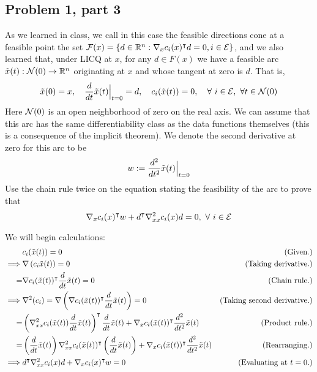 \subsection{Problem 1, part 3}
As we learned in class, we call in this case the feasible directions cone at a feasible point the set $\mathcal{F}(x) = \{ d \in \mathbb{R}^n : \nabla_x c_i(x)^{\intercal} d = 0, i \in \mathcal{E}\}$, and we also learned that, under LICQ at $x$, for any $d \in F(x)$ we have a feasible arc $\Tilde{x}(t): \mathcal{N}(0) \rightarrow \mathbb{R}^n$ originating at $x$ and whose tangent at zero is $d$. That is, 
\[\Tilde{x}(0) = x, \quad \frac{d}{dt}\Tilde{x}(t) \Big|_{t = 0} = d, \quad c_i(\Tilde{x}(t)) = 0,  \quad \forall \ i \in \mathcal{E}, \ \forall t \in \mathcal{N}(0)\]
Here $\mathcal{N}(0)$ is an open neighborhood of zero on the real axis. We can assume that this arc has the same differentiability class as the data functions themselves (this is a consequence of the implicit theorem). We denote the second derivative at zero for this arc to be 
\[w := \frac{d^2}{dt^2}\Tilde{x}(t)\Big|_{t = 0}\]
Use the chain rule twice on the equation stating the feasibility of the arc to prove that
\[\nabla_x c_i(x)^{\intercal} w + d^{\intercal} \nabla_{xx}^2c_i(x) d = 0, \ \forall \ i \in \mathcal{E}\]
\partbreak
\begin{solution}
    
    We will begin calculations:
    \tightalignbreak
    \begin{align*}
        &c_i(\Tilde{x}(t)) = 0 &\text{(Given.)}\\
        \implies &\nabla\left( c_i\Tilde{x}(t)\right) = 0 &\text{(Taking derivative.)}\\
        =& \nabla c_i(\Tilde{x}(t))^{\intercal} \frac{d}{dt}\Tilde{x}(t) = 0 &\text{(Chain rule.)}\\
        \implies & \nabla^2(c_i) = \nabla\left(\nabla c_i(\Tilde{x}(t))^{\intercal} \frac{d}{dt}\Tilde{x}(t) \right) = 0 &\text{(Taking second derivative.)}\\
        =& \left(\nabla^2_{xx} c_i(\Tilde{x}(t)) \frac{d}{dt}\Tilde{x}(t)\right)^{\intercal} \frac{d}{dt}\Tilde{x}(t) + \nabla_x c_i(\Tilde{x}(t))^{\intercal} \frac{d^2}{dt^2}\Tilde{x}(t) &\text{(Product rule.)}\\
        =&\left(\frac{d}{dt}\Tilde{x}(t)\right)\nabla^2_{xx} c_i(\Tilde{x}(t))^{\intercal}  \left(\frac{d}{dt}\Tilde{x}(t)\right) + \nabla_x c_i(\Tilde{x}(t))^{\intercal} \frac{d^2}{dt^2}\Tilde{x}(t) &\text{(Rearranging.)}\\
        \implies & d^{\intercal} \nabla_{xx}^2c_i(x)d + \nabla_x c_i(x)^{\intercal} w = 0 &\text{(Evaluating at $t = 0$.)}
    \end{align*}\vspace{-12mm}\alignbreak
\end{solution}
\newpage
